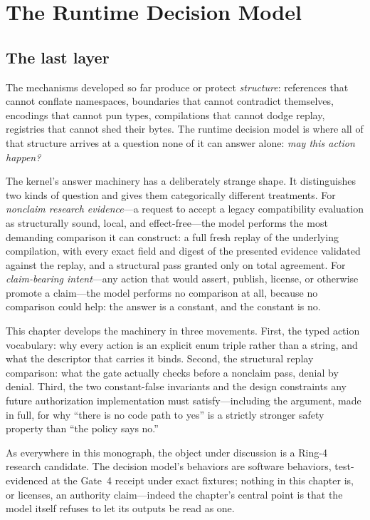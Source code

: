 \chapter{The Runtime Decision Model}\label{ch09:decision}

\section{The last layer}\label{ch09:intro}

The mechanisms developed so far produce or protect \emph{structure}: references that cannot conflate namespaces, boundaries that cannot contradict themselves, encodings that cannot pun types, compilations that cannot dodge replay, registries that cannot shed their bytes. The runtime decision model is where all of that structure arrives at a question none of it can answer alone: \emph{may this action happen?}

The kernel's answer machinery has a deliberately strange shape. It distinguishes two kinds of question and gives them categorically different treatments. For \emph{nonclaim research evidence}---a request to accept a legacy compatibility evaluation as structurally sound, local, and effect-free---the model performs the most demanding comparison it can construct: a full fresh replay of the underlying compilation, with every exact field and digest of the presented evidence validated against the replay, and a structural pass granted only on total agreement. For \emph{claim-bearing intent}---any action that would assert, publish, license, or otherwise promote a claim---the model performs no comparison at all, because no comparison could help: the answer is a constant, and the constant is no.

This chapter develops the machinery in three movements. First, the typed action vocabulary: why every action is an explicit enum triple rather than a string, and what the descriptor that carries it binds. Second, the structural replay comparison: what the gate actually checks before a nonclaim pass, denial by denial. Third, the two constant-false invariants and the design constraints any future authorization implementation must satisfy---including the argument, made in full, for why ``there is no code path to yes'' is a strictly stronger safety property than ``the policy says no.''

As everywhere in this monograph, the object under discussion is a Ring-4 research candidate. The decision model's behaviors are software behaviors, test-evidenced at the Gate~4 receipt under exact fixtures; nothing in this chapter is, or licenses, an authority claim---indeed the chapter's central point is that the model itself refuses to let its outputs be read as one.

